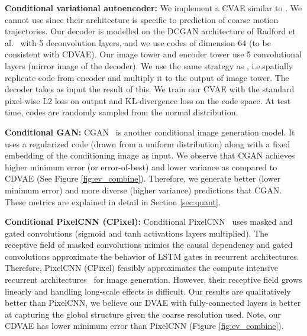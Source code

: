 \documentclass[10pt,twocolumn,letterpaper]{article}
\begin{document}
\textbf{Conditional variational autoencoder: } We implement a CVAE similar to 
\cite{walker2016uncertain}. We cannot use \cite{walker2016uncertain} since
their architecture is specific to prediction of coarse motion trajectories. 
Our decoder is modelled on the DCGAN architecture of Radford et al.~\cite{radford2015unsupervised} with
5 deconvolution layers, and we use codes of dimension $64$ (to be consistent
with CDVAE). Our image tower and encoder tower use 5 convolutional layers (mirror
image of the decoder). We use the same strategy as \cite{walker2016uncertain}, 
i.e.\we spatially replicate code from encoder and multiply it to the output of image
tower. The decoder takes as input the result of this. We train our CVAE with the standard 
pixel-wise L2 loss on output and KL-divergence loss on the code space. At test time, 
codes are randomly sampled from the normal distribution. 

\textbf{Conditional GAN:} CGAN~\cite{mirza2014conditional} is another conditional 
image generation model. It uses a regularized code (drawn from a uniform distribution) 
along with a fixed embedding of the conditioning image as input. We observe that
CGAN achieves higher minimum error (or error-of-best) and lower variance as 
compared to CDVAE (See Figure \ref{fig:ev_combine}). Therefore, we generate better 
(lower minimum error) and more diverse (higher variance) predictions that CGAN.
These metrics are explained in detail in Section \ref{sec:quant}.


\textbf{Conditional PixelCNN (CPixel):} Conditional PixelCNN~\cite{oord2016conditional} uses masked
and gated convolutions (sigmoid and tanh activations layers multiplied). The 
receptive field of masked convolutions mimics the causal dependency and gated convolutions
approximate the behavior of LSTM gates in recurrent architectures. Therefore, PixelCNN (CPixel) 
feasibly approximates the compute intensive recurrent architectures~\cite{gregor2015draw} for 
image generation. However, their receptive field grows linearly and handling long-scale effects 
is difficult. Our results are qualitatively better than PixelCNN, we believe our DVAE with 
fully-connected layers is better at capturing the global structure given the coarse resolution 
used. Note, our CDVAE has lower minimum error than PixelCNN (Figure \ref{fig:ev_combine}).
\end{document}
